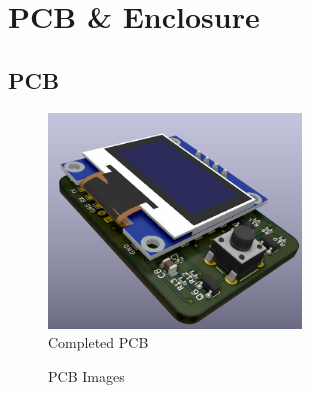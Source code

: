\section{PCB \& Enclosure}

	\subsection{PCB}	
	
		\begin{figure}[ht!]
			\centering
			\includegraphics[width=0.6\textwidth]{../common/pcb/pcb.png}
			\caption{Completed PCB}
		\end{figure}


		\begin{figure}[ht!]
			\centering
			\hfill
			\caption{PCB Images}
		\end{figure}

